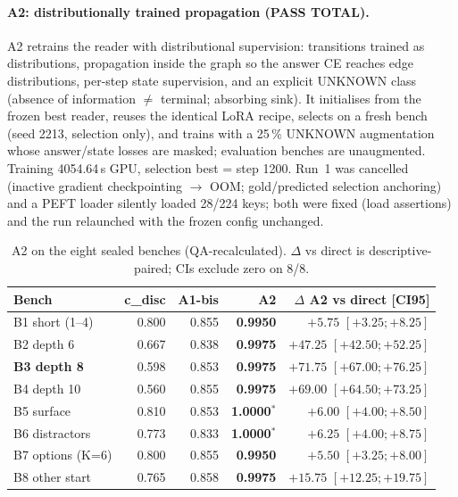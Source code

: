\documentclass[11pt,a4paper]{article}
\newcommand{\dpt}{\ensuremath{\Delta}}
\begin{document}
\paragraph{A2: distributionally trained propagation (PASS TOTAL).} A2 retrains the reader with distributional supervision: transitions trained as distributions, propagation inside the graph so the answer CE reaches edge distributions, per-step state supervision, and an explicit UNKNOWN class (absence of information $\ne$ terminal; absorbing sink). It initialises from the frozen best reader, reuses the identical LoRA recipe, selects on a fresh bench (seed 2213, selection only), and trains with a 25\,\% UNKNOWN augmentation whose answer/state losses are masked; evaluation benches are unaugmented. Training 4054.64\,s GPU, selection best = step 1200. Run~1 was cancelled (inactive gradient checkpointing $\to$ OOM; gold/predicted selection anchoring) and a PEFT loader silently loaded 28/224 keys; both were fixed (load assertions) and the run relaunched with the frozen config unchanged.

\begin{table}[t]
\centering
\caption{A2 on the eight sealed benches (QA-recalculated). $\dpt$ vs direct is descriptive-paired; CIs exclude zero on 8/8.}
\label{tab:a2}
\small
\begin{tabular}{lrrrr}
\toprule
Bench & c\_disc & A1-bis & \textbf{A2} & $\dpt$ A2 vs direct [CI95] \\
\midrule
B1 short (1--4) & 0.800 & 0.855 & \textbf{0.9950} & $+5.75$ $[+3.25;+8.25]$ \\
B2 depth 6 & 0.667 & 0.838 & \textbf{0.9975} & $+47.25$ $[+42.50;+52.25]$ \\
\textbf{B3 depth 8} & 0.598 & 0.853 & \textbf{0.9975} & $\mathbf{+71.75}$ $[+67.00;+76.25]$ \\
B4 depth 10 & 0.560 & 0.855 & \textbf{0.9975} & $+69.00$ $[+64.50;+73.25]$ \\
B5 surface & 0.810 & 0.853 & \textbf{1.0000}$^\ast$ & $+6.00$ $[+4.00;+8.50]$ \\
B6 distractors & 0.773 & 0.833 & \textbf{1.0000}$^\ast$ & $+6.25$ $[+4.00;+8.75]$ \\
B7 options (K=6) & 0.800 & 0.855 & \textbf{0.9950} & $+5.50$ $[+3.25;+8.00]$ \\
B8 other start & 0.765 & 0.858 & \textbf{0.9975} & $+15.75$ $[+12.25;+19.75]$ \\
\bottomrule
\end{tabular}
\end{table}
\end{document}
